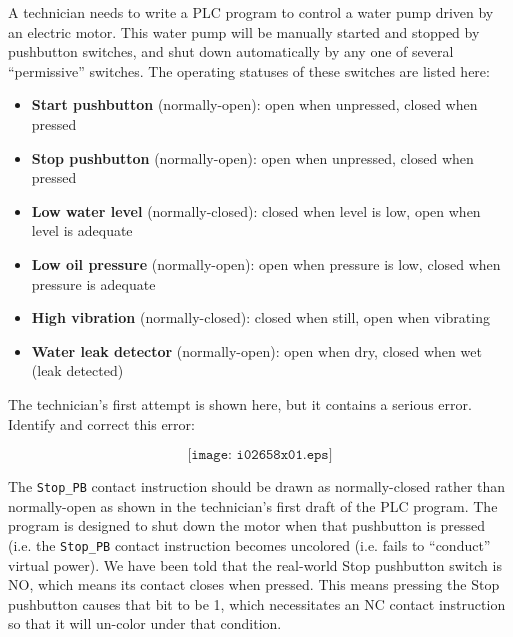 

A technician needs to write a PLC program to control a water pump driven by an electric motor.  This water pump will be manually started and stopped by pushbutton switches, and shut down automatically by any one of several ``permissive'' switches.  The operating statuses of these switches are listed here:

\begin{itemize}
\item{} {\bf Start pushbutton} (normally-open): open when unpressed, closed when pressed
\item{} {\bf Stop pushbutton} (normally-open): open when unpressed, closed when pressed
\item{} {\bf Low water level} (normally-closed): closed when level is low, open when level is adequate
\item{} {\bf Low oil pressure} (normally-open): open when pressure is low, closed when pressure is adequate
\item{} {\bf High vibration} (normally-closed): closed when still, open when vibrating
\item{} {\bf Water leak detector} (normally-open): open when dry, closed when wet (leak detected)
\end{itemize}

The technician's first attempt is shown here, but it contains a serious error.  Identify and correct this error:

$$\texttt{[image: i02658x01.eps]}$$







The {\tt Stop\_PB} contact instruction should be drawn as normally-closed rather than normally-open as shown in the technician's first draft of the PLC program.  The program is designed to shut down the motor when that pushbutton is pressed (i.e. the {\tt Stop\_PB} contact instruction becomes uncolored (i.e. fails to ``conduct'' virtual power).  We have been told that the real-world Stop pushbutton switch is NO, which means its contact closes when pressed.  This means pressing the Stop pushbutton causes that bit to be 1, which necessitates an NC contact instruction so that it will un-color under that condition.












